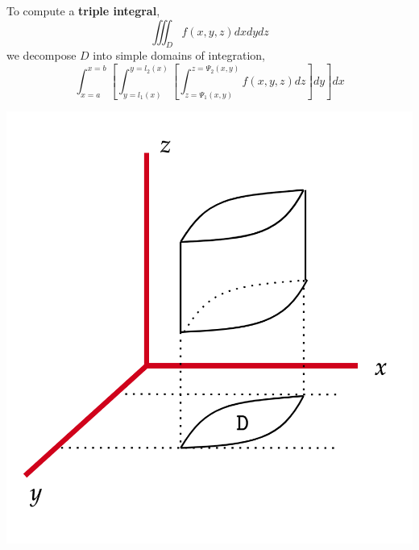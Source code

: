 \begin{rmk}
    To compute a \textbf{triple integral},
    \[\iiint_D f(x, y, z) d x d y d z\]
    we decompose $D$ into simple domains of integration,
    \[\int_{x=a}^{x=b}\left[\int_{y=l_1(x)}^{y=l_2(x)}\left[\int_{z=\Psi_1(x, y)}^{z=\Psi_2(x, y)} f(x, y, z) d z\right] d y\right] d x\]
\end{rmk}

\begin{marginfigure}
        \begin{center}
        \includegraphics[width=\linewidth]{figures/wk-6/type-4.png}
        \end{center}
\end{marginfigure}

